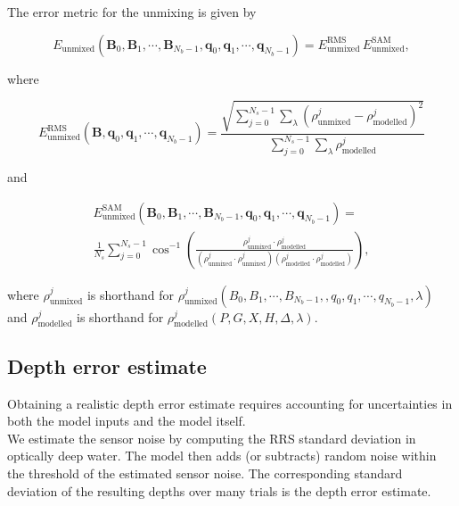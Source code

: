 \documentclass[12pt]{article}
\numberwithin{equation}{section}
\begin{document}
The error metric for the unmixing is given by 
\begin{linenomath}
\begin{equation*}
E_{\text{unmixed}}\left(\textbf{B}_0, \textbf{B}_1, \cdots, \textbf{B}_{N_b-1}, 
\textbf{q}_0, \textbf{q}_1, \cdots, \textbf{q}_{N_b-1}\right) = 
E^{\text{RMS}}_{\text{unmixed}}\,E^{\text{SAM}}_{\text{unmixed}},
\end{equation*}
\end{linenomath}
where
\begin{linenomath} 
\begin{equation*}
E^{\text{RMS}}_{\text{unmixed}}\left( \textbf{B}, \textbf{q}_0, \textbf{q}_1, \cdots, \textbf{q}_{N_b-1} \right) =
\frac{\sqrt{\sum\limits_{j=0}^{N_s-1}\sum\limits_{\lambda} \left(\rho_{\text{unmixed}}^j - \rho_{\text{modelled}}^j\right)^2}}
	{\sum\limits_{j=0}^{N_s-1}\sum\limits_{\lambda} \rho_{\text{modelled}}^j}
\end{equation*}
\end{linenomath}
and 
\begin{linenomath}
\begin{multline*}
E^{\text{SAM}}_{\text{unmixed}}\left(\textbf{B}_0, \textbf{B}_1, \cdots, \textbf{B}_{N_b-1}, \textbf{q}_0, \textbf{q}_1, \cdots, \textbf{q}_{N_b-1} \right) = \\
\frac{1}{N_s}\sum\limits_{j=0}^{N_s-1} \cos^{-1}\left( \frac{\rho_{\text{unmixed}}^j \cdot \rho_{\text{modelled}}^j}
	{\left(\rho_{\text{unmixed}}^j \cdot \rho_{\text{unmixed}}^j\right) \left(\rho_{\text{modelled}}^j \cdot \rho_{\text{modelled}}^j\right)} \right),
\end{multline*}
\end{linenomath}
where $\rho_{\text{unmixed}}^j$ is shorthand for $\rho_{\text{unmixed}}^j(B_0, B_1, \cdots, B_{N_b-1}, , q_0, q_1, \cdots, q_{N_b-1}, \lambda)$ 
and $\rho_{\text{modelled}}^j$ is shorthand for $\rho_{\text{modelled}}^j(P, G, X, H, \Delta, \lambda)$. 

	\subsection{Depth error estimate}

Obtaining a realistic depth error estimate requires accounting for uncertainties in both 
the model inputs and the model itself. \\

We estimate the sensor noise by computing the RRS standard deviation in optically deep 
water. The model then adds (or subtracts) random noise within the threshold of the 
estimated sensor noise. The corresponding standard deviation of the resulting depths 
over many trials is the depth error estimate. \\
\end{document}
